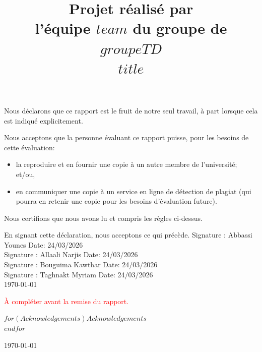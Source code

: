 \documentclass[mstat,12pt]{unswthesis}
\title{Projet réalisé par\\[0.5cm] l'équipe $team$ du groupe de $groupeTD$ \\[3cm]$title$}
\author{\Authornameonly}
\begin{document}
\beforepreface




\vskip 2pc \noindent Nous déclarons que ce rapport est le fruit de notre seul travail, à part lorsque cela est indiqué  explicitement. 

\vskip 2pc  \noindent Nous acceptons que la personne évaluant ce rapport puisse, pour les besoins de cette évaluation:
\begin{itemize}
\item la reproduire et en fournir une copie à un autre membre de l'université; et/ou,
\item en communiquer une copie à un service en ligne de détection de plagiat (qui pourra en retenir une copie pour les besoins d'évaluation future).
\end{itemize}

\vskip 2pc \noindent Nous certifions que nous avons lu et compris les règles ci-dessus.\vspace{24pt}

\vskip 2pc \noindent En signant cette déclaration, nous acceptons ce qui précède.
\vskip 2pc \noindent
Signature : Abbassi Younes \hfill Date: 24/03/2026\\[1cm]
Signature : Allaali Narjis \hfill Date: 24/03/2026 \\[1cm]
Signature : Bouguima Kawthar \hfill Date: 24/03/2026\\[1cm]
Signature : Taghnakt Myriam \hfill Date: 24/03/2026 \\[1cm]


{\bigskip\bigskip\bigskip\noindent} \today




\textcolor{red}{À compléter avant la remise du rapport.}

{\bigskip}$for(Acknowledgements)$$Acknowledgements$\\[1cm] $endfor$

{\bigskip\bigskip\bigskip\noindent} \today

\end{document}
